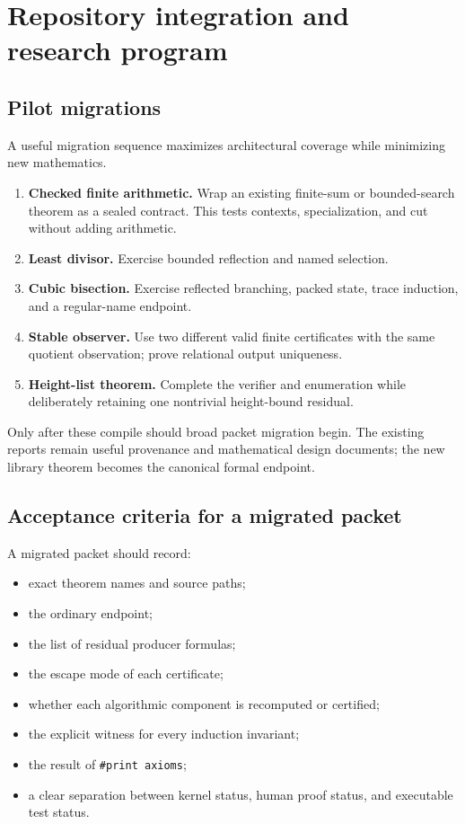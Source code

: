 \section{Repository integration and research program}
\label{sec:integration}

\subsection{Pilot migrations}

A useful migration sequence maximizes architectural coverage while minimizing
new mathematics.

\begin{enumerate}[label=(\arabic*)]
\item \textbf{Checked finite arithmetic.}  Wrap an existing finite-sum or
  bounded-search theorem as a sealed contract.  This tests contexts,
  specialization, and cut without adding arithmetic.
\item \textbf{Least divisor.}  Exercise bounded reflection and named selection.
\item \textbf{Cubic bisection.}  Exercise reflected branching, packed state,
  trace induction, and a regular-name endpoint.
\item \textbf{Stable observer.}  Use two different valid finite certificates
  with the same quotient observation; prove relational output uniqueness.
\item \textbf{Height-list theorem.}  Complete the verifier and enumeration while
  deliberately retaining one nontrivial height-bound residual.
\end{enumerate}

Only after these compile should broad packet migration begin.  The existing
reports remain useful provenance and mathematical design documents; the new
library theorem becomes the canonical formal endpoint.

\subsection{Acceptance criteria for a migrated packet}

A migrated packet should record:

\begin{itemize}
\item exact theorem names and source paths;
\item the ordinary  endpoint;
\item the list of residual producer formulas;
\item the escape mode of each certificate;
\item whether each algorithmic component is recomputed or certified;
\item the explicit  witness for every induction invariant;
\item the result of \texttt{\#print axioms};
\item a clear separation between kernel status, human proof status, and
  executable test status.
\end{itemize}

